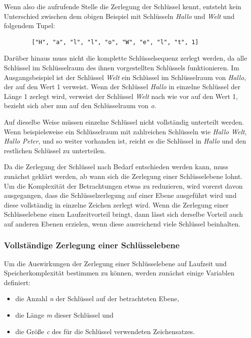 \documentclass[oneside]{ausarbeitung}
\begin{document}
	Wenn also die aufrufende Stelle die Zerlegung der Schlüssel kennt, entsteht kein Unterschied zwischen dem obigen Beispiel mit Schlüsseln \textit{Hallo} und \textit{Welt} und folgendem Tupel:
	
	\begin{lstlisting}
		["H", "a", "l", "l", "o", "W", "e", "l", "t", 1]
	\end{lstlisting}
	
	Darüber hinaus muss nicht die komplette Schlüsselsequenz zerlegt werden, da alle Schlüssel im Schlüsselraum des ihnen vorgestellten Schlüssels funktionieren. Im Ausgangsbeispiel ist der Schlüssel \textit{Welt} ein Schlüssel im Schlüsselraum von \textit{Hallo}, der auf den Wert 1 verweist. Wenn der Schlüssel \textit{Hallo} in einzelne Schlüssel der Länge 1 zerlegt wird, verweist der Schlüssel \textit{Welt} nach wie vor auf den Wert 1, bezieht sich aber nun auf den Schlüsselraum von \textit{o}. 
	
	Auf dieselbe Weise müssen einzelne Schlüssel nicht vollständig unterteilt werden. Wenn beispielsweise ein Schlüsselraum mit zahlreichen Schlüsseln wie \textit{Hallo Welt}, \textit{Hallo Peter}, und so weiter vorhanden ist, reicht es die Schlüssel in \textit{Hallo} und den restlichen Schlüssel zu unterteilen. 
	
	Da die Zerlegung der Schlüssel nach Bedarf entschieden werden kann, muss zunächst geklärt werden, ab wann sich die Zerlegung einer Schlüsselebene lohnt. Um die Komplexität der Betrachtungen etwas zu reduzieren, wird vorerst davon ausgegangen, dass die Schlüsselzerlegung auf einer Ebene ausgeführt wird und diese vollständig in einzelne Zeichen zerlegt wird. Wenn die Zerlegung einer Schlüsselebene einen Laufzeitvorteil bringt, dann lässt sich derselbe Vorteil auch auf anderen Ebenen erzielen, wenn diese ausreichend viele Schlüssel beinhalten.
	
	\subsubsection{Vollständige Zerlegung einer Schlüsselebene}
	
	Um die Auswirkungen der Zerlegung einer Schlüsselebene auf Laufzeit und Speicherkomplexität bestimmen zu können, werden zunächst einige Variablen definiert:
	\begin{itemize}
		\item die Anzahl \textit{n} der Schlüssel auf der betrachteten Ebene,
		\item die Länge \textit{m} dieser Schlüssel und
		\item die Größe \textit{c} des für die Schlüssel verwendeten Zeichensatzes.
	\end{itemize}
	
\end{document}
